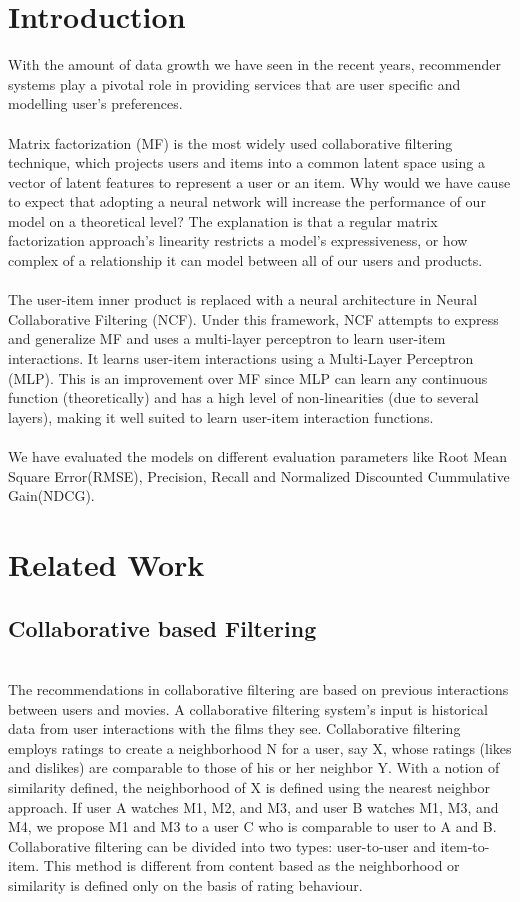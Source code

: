 \documentclass[sigconf]{acmart}
\begin{document}
\section{Introduction}
With the amount of data growth we have seen in the recent years, recommender systems
play a pivotal role in providing services that are user specific and modelling user's preferences. \\\\
Matrix factorization (MF) is the most widely used collaborative filtering technique, which projects users and items into a common latent space using a vector of latent features to represent a user or an item. Why would we have cause to expect that adopting a neural network will increase the performance of our model on a theoretical level? The explanation is that a regular matrix factorization approach's linearity restricts a model's expressiveness, or how complex of a relationship it can model between all of our users and products. \\\\
The user-item inner product is replaced with a neural architecture in Neural Collaborative Filtering (NCF). Under this framework, NCF attempts to express and generalize MF and uses a multi-layer perceptron to learn user-item interactions. It learns user-item interactions using a Multi-Layer Perceptron (MLP). This is an improvement over MF since MLP can learn any continuous function (theoretically) and has a high level of non-linearities (due to several layers), making it well suited to learn user-item interaction functions.\\\\
We have evaluated the models on different evaluation parameters like Root Mean Square Error(RMSE), Precision, Recall and Normalized Discounted Cummulative Gain(NDCG). 

\section{Related Work}\label{sec:related}
\subsection{Collaborative based Filtering} \\
The recommendations in collaborative filtering are based on previous interactions between users and movies. A collaborative filtering system's input is historical data from user interactions with the films they see. 
Collaborative filtering employs ratings to create a neighborhood N for a user, say X, whose ratings (likes and dislikes) are comparable to those of his or her neighbor Y. With a notion of similarity defined, the neighborhood of X is defined using the nearest neighbor approach. 
If user A watches M1, M2, and M3, and user B watches M1, M3, and M4, we propose M1 and M3 to a user C who is comparable to user to A and B. 
Collaborative filtering can be divided into two types: user-to-user and item-to-item. This method is different from content based
as the neighborhood or similarity is defined only on the
basis of rating behaviour.\\
\end{document}
